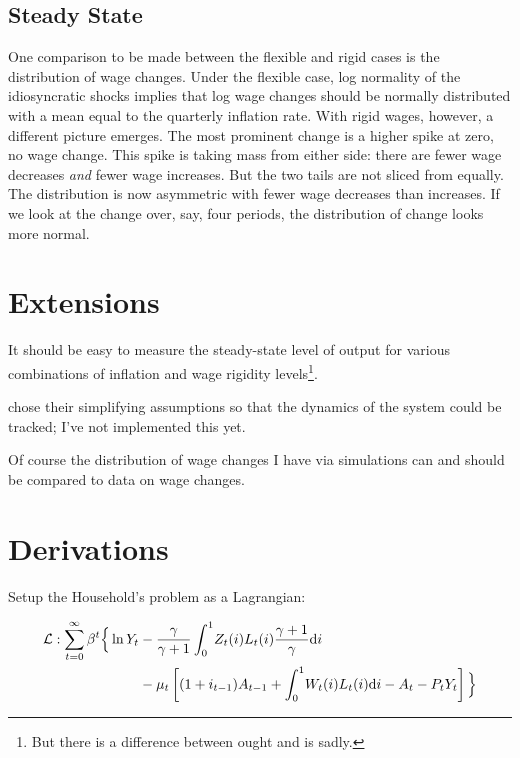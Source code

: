 \documentclass[12pt,a4paper]{scrartcl}            %
\begin{document}
\subsection{Steady State}
\label{sub:steady_state}

One comparison to be made between the flexible and rigid cases is the distribution of wage changes.
Under the flexible case, log normality of the idiosyncratic shocks implies that log wage changes should be normally distributed with a mean equal to the quarterly inflation rate.
With rigid wages, however, a different picture emerges.
The most prominent change is a higher spike at zero, no wage change.
This spike is taking mass from either side: there are fewer wage decreases \emph{and} fewer wage increases.
But the two tails are not sliced from equally.
The distribution is now asymmetric with fewer wage decreases than increases.
If we look at the change over, say, four periods, the distribution of change looks more normal.


\section{Extensions}
\label{sec:extensions}

It should be easy to measure the steady-state level of output for various combinations of inflation and wage rigidity levels\footnote{But there is a difference between ought and is sadly.}.

\cite{daly_hobijn_2013} chose their simplifying assumptions so that the dynamics of the system could be tracked;
I've not implemented this yet.

Of course the distribution of wage changes I have via simulations can and should be compared to data on wage changes.

\newpage



\newpage
\appendix

\section{Derivations}

Setup the Household's problem as a Lagrangian:

\begin{equation}
    \label{eqa:houehold}
    \begin{split}
        \mathcal{L} : \sum_{t=0}^{\infty} \beta^t \Big\{ \ln Y_t & - \frac{\gamma}{\gamma + 1} \int_{0}^{1} \! Z_t(i)L_t(i) \frac{\gamma + 1}{\gamma} \mathrm{d}i \\
                                                           & - \mu_t \left[ (1 + i_{t-1})A_{t-1} + \int_{0}^{1} \! W_t(i)L_t(i) \mathrm{d}i  - A_t - P_tY_t\right] \Big\}
    \end{split}
\end{equation}
\end{document}
